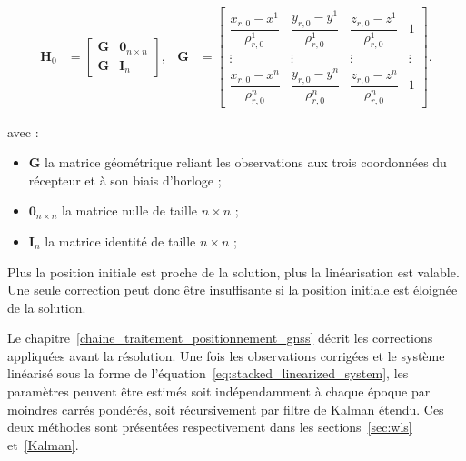 \begin{align}
\mathbf H_0
&=
\begin{bmatrix}
\mathbf G & \mathbf 0_{n\times n}\\
\mathbf G & \mathbf I_n
\end{bmatrix},
&
\mathbf G
&=
\begin{bmatrix}
\dfrac{x_{r,0}-x^1}{\rho_{r,0}^1} &
\dfrac{y_{r,0}-y^1}{\rho_{r,0}^1} &
\dfrac{z_{r,0}-z^1}{\rho_{r,0}^1} & 1\\
\vdots & \vdots & \vdots & \vdots\\
\dfrac{x_{r,0}-x^n}{\rho_{r,0}^n} &
\dfrac{y_{r,0}-y^n}{\rho_{r,0}^n} &
\dfrac{z_{r,0}-z^n}{\rho_{r,0}^n} & 1
\end{bmatrix}.
\label{eq:gnss_design_matrix}
\end{align}

avec :

\begin{itemize}
    \item $\mathbf G$ la matrice géométrique reliant les observations aux
    trois coordonnées du récepteur et à son biais d'horloge ;
    \item $\mathbf 0_{n\times n}$ la matrice nulle de taille $n\times n$ ;
    \item $\mathbf I_n$ la matrice identité de taille $n\times n$ ;
\end{itemize}

Plus la position initiale est proche de la solution, plus la linéarisation est valable. Une seule correction peut donc être insuffisante si la
position initiale est éloignée de la solution.

Le chapitre~\ref{chaine_traitement_positionnement_gnss} décrit les corrections
appliquées avant la résolution. Une fois les observations corrigées et le
système linéarisé sous la forme de l'équation~\eqref{eq:stacked_linearized_system},
les paramètres peuvent être estimés soit indépendamment à chaque époque par
moindres carrés pondérés, soit récursivement par filtre de Kalman étendu. Ces
deux méthodes sont présentées respectivement dans les
sections~\ref{sec:wls} et~\ref{Kalman}.
